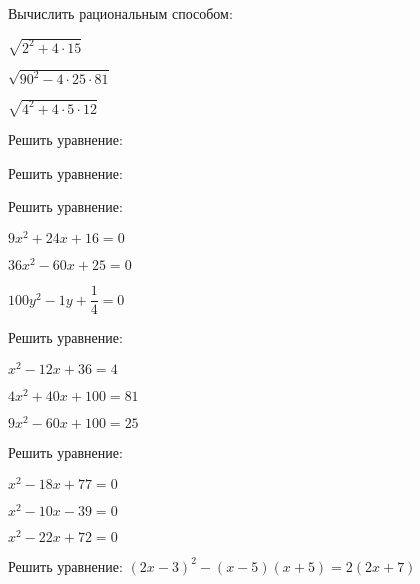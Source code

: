 \begin{class}[number=2]
	\begin{listofex}
		\item Вычислить рациональным способом:
		\begin{enumcols}[itemcolumns=3]
			\item \( \sqrt{2^2+4\cdot15} \)
			\item \( \sqrt{90^2-4\cdot25\cdot81} \)
			\item \( \sqrt{4^2+4\cdot5\cdot12} \)
		\end{enumcols}
	\item Решить уравнение:
	\begin{enumcols}[itemcolumns=3]
		\item {}
		\item {}
		\item {}
		\item {}
		\item {}
		\item {}
	\end{enumcols}
	\item Решить уравнение:
	\begin{enumcols}[itemcolumns=3]
		\item {}
		\item {}
		\item {}
		\item {}
		\item {}
		\item {}
	\end{enumcols}
	\item Решить уравнение:
	\begin{enumcols}[itemcolumns=3]
		\item \( 9x^2+24x+16=0 \)
		\item \( 36x^2-60x+25=0 \)
		\item \( 100y^2-1y+\dfrac{1}{4}=0 \)
		\end{enumcols}
	\item Решить уравнение:
	\begin{enumcols}[itemcolumns=3]
		\item \( x^2-12x+36=4 \)
		\item \( 4x^2+40x+100=81 \)
		\item \( 9x^2-60x+100=25 \)
	\end{enumcols}
	\item Решить уравнение:
	\begin{enumcols}[itemcolumns=3]
		\item \( x^2-18x+77=0 \)
		\item \( x^2-10x-39=0 \)
		\item \( x^2-22x+72=0 \)
	\end{enumcols}
	\item Решить уравнение: \( (2x-3)^2-(x-5)(x+5)=2(2x+7) \)
	\end{listofex}
\end{class}
